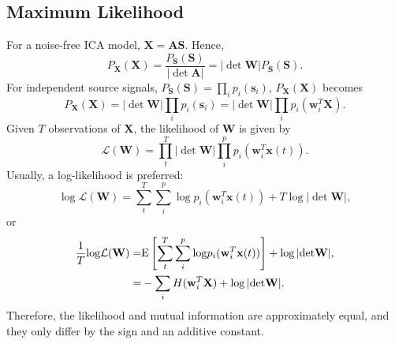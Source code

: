 \subsection{Maximum Likelihood\label{Sec:DR:ICA:ML}}
For a noise-free ICA model, $\mathbf{X}=\mathbf{AS}$. Hence,
\begin{equation}
	P_\mathbf{X}(\mathbf{X})=\frac{P_\mathbf{S}(\mathbf{S})}{|{\operatorname{det}}\mathbf{A}|}=|{\operatorname{det}}\mathbf{W}|P_\mathbf{S}(\mathbf{S}).
\end{equation}
For independent source signals, $P_\mathbf{S}(\mathbf{S})=\prod_ip_i(\mathbf{s}_i)$, $P_\mathbf{X}(\mathbf{X})$ becomes
\begin{equation}
	P_\mathbf{X}(\mathbf{X})=|{\operatorname{det}}\mathbf{W}|\prod_ip_i(\mathbf{s}_i)=|{\operatorname{det}}\mathbf{W}|\prod_ip_i(\mathbf{w}_i^T\mathbf{X}).
\end{equation}
Given $T$ observations of $\mathbf{X}$, the likelihood of $\mathbf{W}$ is given by
\begin{equation}
	\mathcal{L}(\mathbf{W})=\prod_t^T|{\operatorname{det}}\mathbf{W}|\prod_i^p p_i(\mathbf{w}_i^T\mathbf{x}(t)).
\end{equation}
Usually, a log-likelihood is preferred:
\begin{equation}
	{\operatorname{log}}\mathcal{L}(\mathbf{W})=\sum_t^T\sum_i^p{\operatorname{log}}p_i(\mathbf{w}_i^T\mathbf{x}(t))+T\operatorname{log}|{\operatorname{det}}\mathbf{W}|,
\end{equation}
or
\begin{align}
	\frac{1}{T}{\operatorname{log}}\mathcal{L}(\mathbf{W})=&{\operatorname{E}}\left[\sum_t^T\sum_i^p{\operatorname{log}}p_i(\mathbf{w}_i^T\mathbf{x}(t))\right]+\operatorname{log}|{\operatorname{det}}\mathbf{W}|,\notag\\
	=&-\sum_i H(\mathbf{w}_i^T\mathbf{X})+\operatorname{log}|{\operatorname{det}}\mathbf{W}|.
\end{align}
Therefore, the likelihood and mutual information are approximately equal, and they only differ by the sign and an additive constant.